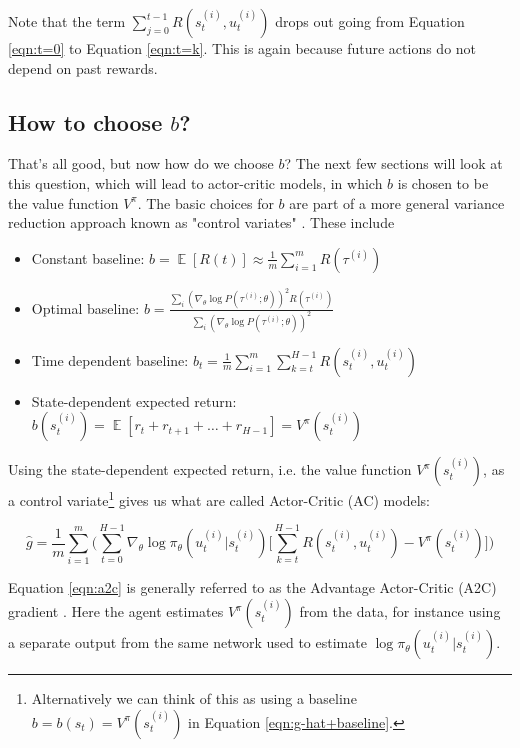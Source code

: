 \documentclass[11pt, oneside]{article}   	%
\DeclareMathOperator{\E}{\mathbb{E}}
\begin{document}
\bigskip
\noindent 
Note that the term $\sum\limits_{j = 0}^{t - 1} R(s^{(i)}_t, u^{(i)}_t)$ drops out going from Equation \ref{eqn:t=0} to Equation \ref{eqn:t=k}.  This is again because
future actions do not depend on past rewards.

\subsection{How to choose $b$?}
\label{seq:choosing_b}

That's all good, but now how do we choose $b$? The next few sections will look at this question, which will lead to actor-critic models, in which $b$ is chosen to be the value function $V^\pi$. The basic 
choices for $b$ are part of a more general variance reduction approach known as "control variates" \cite{Greensmith:2004:VRT:1005332.1044710}. These include

\begin{itemize}
\item Constant baseline: $b = \E [R(t)] \approx \frac{1}{m} \sum\limits_{i = 1}^{m} R(\tau^{(i)})$ \\
\item Optimal baseline: $b = \frac{\sum\limits_i (\nabla_\theta \log P(\tau^{(i)}; \theta))^2 R(\tau^{(i)})}
{\sum\limits_i (\nabla_\theta \log P(\tau^{(i)}; \theta))^2}$
\item Time dependent baseline: $b_t = \frac{1}{m} \sum\limits_{i = 1}^{m} \sum\limits_{k = t}^{H -1} R(s^{(i)}_t, u^{(i)}_t)$
\item State-dependent expected return: $b(s^{(i)}_t) = \E[r_t + r_{t + 1} + \hdots + r_{H - 1}] = V^{\pi}(s^{(i)}_t)$
\end{itemize}

\bigskip
\noindent
Using the state-dependent expected return, i.e. the value function $V^\pi(s^{(i)}_t)$,  as a control variate\footnote{Alternatively we can think of this as using a baseline 
$b = b(s_t) = V^{\pi}(s^{(i)}_t)$ in Equation \ref{eqn:g-hat+baseline}.} gives us what are called Actor-Critic (AC) models:

\bigskip
\begin{equation}
\hat{g} = \frac{1}{m} \sum\limits_{i = 1}^{m} \Bigg ( \sum\limits_{t = 0}^{H - 1} \nabla_{\theta} \log \pi_{\theta} (u^{(i)}_t | s^{(i)}_t) \Bigg [
 \sum\limits_{k = t}^{H - 1} R(s^{(i)}_t, u^{(i)}_t) 
- V^{\pi}(s^{(i)}_t) \Bigg ] \Bigg )
\label{eqn:a2c}
\end{equation}

\bigskip
\noindent
Equation \ref{eqn:a2c} is generally referred to as the Advantage Actor-Critic (A2C) gradient \cite{2018arXiv180302811S}. Here the agent estimates
$V^\pi (s^{(i)}_t)$ from the data, for instance using a separate
output from the same network used to estimate  $\log \pi_{\theta} (u^{(i)}_t | s^{(i)}_t)$.  
\end{document}
